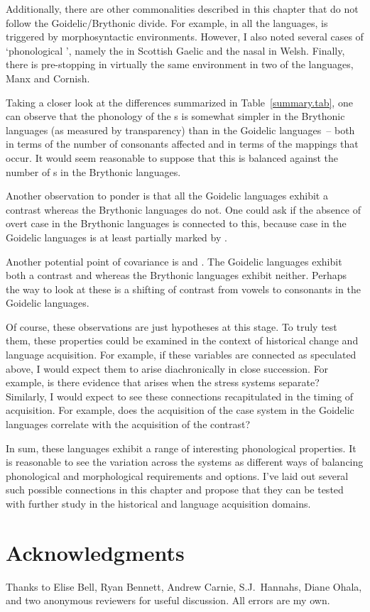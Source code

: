 \documentclass[output=paper,colorlinks,citecolor=brown]{langscibook}
\begin{document}
Additionally, there are other commonalities described in this chapter that do not follow the Goidelic/Brythonic divide. For example, in all the languages, \m{} is triggered by morphosyntactic environments. However, I also noted several cases of `phonological \m{}', namely the  \m{} in Scottish Gaelic and the nasal \m{} in Welsh. Finally, there is pre-stopping in virtually the same environment in two of the languages, Manx and Cornish.

Taking a closer look at the differences summarized in Table~\ref{summary.tab}, one can observe that the phonology of the \m s is somewhat simpler in the Brythonic languages (as measured by transparency) than in the Goidelic languages~-- both in terms of the number of consonants affected and in terms of the mappings that occur. It would seem reasonable to suppose that this is balanced against the number of \m s in the Brythonic languages.

Another observation to ponder is that all the Goidelic languages exhibit a  contrast whereas the Brythonic languages do not. One could ask if the absence of overt case in the Brythonic languages is connected to this, because case in the Goidelic languages is at least partially marked by .

Another potential point of covariance is  and . The Goidelic languages exhibit both a  contrast and  whereas the Brythonic languages exhibit neither. Perhaps the way to look at these is a shifting of contrast from vowels to consonants in the Goidelic languages.

Of course, these observations are just hypotheses at this stage. To truly test them,  these properties could be examined in the context of historical change and language acquisition. For example, if these variables are connected as speculated above, I would expect them to arise diachronically in close succession. For example, is there evidence that  arises when the stress systems separate? Similarly, I would expect to see these connections recapitulated in the timing of acquisition. For example, does the acquisition of the case system in the Goidelic languages correlate with the acquisition of the  contrast?

In sum, these languages exhibit a range of interesting phonological properties. It is reasonable to see the variation across the systems as different ways of balancing phonological and morphological requirements and options. I've laid out several such possible connections in this chapter and propose that they can be tested with further study in the historical and language acquisition domains.

\section*{Acknowledgments}

Thanks to 
Elise Bell,
Ryan Bennett,
Andrew Carnie,
S.J.\ Hannahs,
Diane Ohala,
and two anonymous reviewers
for useful discussion.
All errors are my own.


\printbibliography[heading=subbibliography,notkeyword=this]
\end{document}
